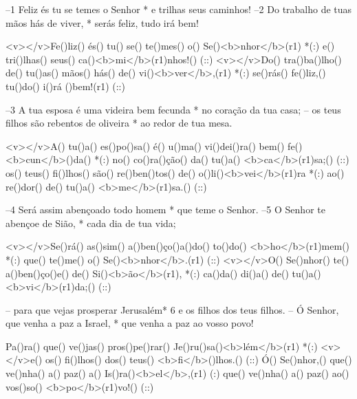 –1 Feliz és tu se temes o Senhor *
e trilhas seus caminhos!
–2 Do trabalho de tuas mãos hás de viver, *
serás feliz, tudo irá bem!

<v></v>Fe()liz() és() tu() se() te()mes() o() Se()<b>nhor</b>(r1) *(:)
e() tri()lhas() seus() ca()<b>mi</b>(r1)nhos!() (::)
<v></v>Do() tra()ba()lho() de() tu()as() mãos() hás() de() vi()<b>ver</b>,(r1) *(:)
se()rás() fe()liz,() tu()do() i()rá ()bem!(r1) (::)

–3 A tua esposa é uma videira bem fecunda *
no coração da tua casa;
– os teus filhos são rebentos de oliveira *
ao redor de tua mesa.

<v></v>A() tu()a() es()po()sa() é() u()ma() vi()dei()ra() bem() fe()<b>cun</b>()da() *(:)
no() co()ra()ção() da() tu()a() <b>ca</b>(r1)sa;() (::)
os() teus() fi()lhos() são() re()ben()tos() de() o()li()<b>vei</b>(r1)ra *(:)
ao() re()dor() de() tu()a() <b>me</b>(r1)sa.() (::)

–4 Será assim abençoado todo homem *
que teme o Senhor.
–5 O Senhor te abençoe de Sião, *
cada dia de tua vida;

<v></v>Se()rá() as()sim() a()ben()ço()a()do() to()do() <b>ho</b>(r1)mem() *(:)
que() te()me() o() Se()<b>nhor</b>.(r1) (::)
<v></v>O() Se()nhor() te() a()ben()ço()e() de() Si()<b>ão</b>(r1), *(:)
ca()da() di()a() de() tu()a() <b>vi</b>(r1)da;() (::)

– para que vejas prosperar Jerusalém*
6 e os filhos dos teus filhos.
– Ó Senhor, que venha a paz a Israel, *
que venha a paz ao vosso povo!

Pa()ra() que() ve()jas() pros()pe()rar() Je()ru()sa()<b>lém</b>(r1) *(:)
<v></v>e() os() fi()lhos() dos() teus() <b>fi</b>()lhos.() (::)
Ó() Se()nhor,() que() ve()nha() a() paz() a() Is()ra()<b>el</b>,(r1) (:)
que() ve()nha() a() paz() ao() vos()so() <b>po</b>(r1)vo!() (::)